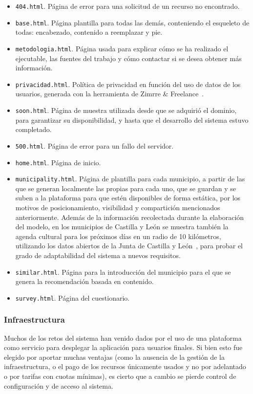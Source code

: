 \begin{itemize}
	\item \texttt{404.html}. Página de error para una solicitud de un recurso no encontrado.
	\item \texttt{base.html}. Página plantilla para todas las demás, conteniendo el esqueleto de todas: encabezado, contenido a reemplazar y pie.
	\item \texttt{metodologia.html}. Página usada para explicar cómo se ha realizado el ejecutable, las fuentes del trabajo y cómo contactar si se desea obtener más información.
	\item \texttt{privacidad.html}. Política de privacidad en función del uso de datos de los usuarios, generada con la herramienta de Zimrre \& Freelance~\cite{privacidad}.
	\item \texttt{soon.html}. Página de muestra utilizada desde que se adquirió el dominio, para garantizar su disponibilidad, y hasta que el desarrollo del sistema estuvo completado.
	\item \texttt{500.html}. Página de error para un fallo del servidor.
	\item \texttt{home.html}. Página de inicio.
	\item \texttt{municipality.html}. Página de plantilla para cada municipio, a partir de las que se generan localmente las propias para cada uno, que se guardan y se suben a la plataforma para que estén disponibles de forma estática, por los motivos de posicionamiento, visibilidad y compartición mencionados anteriormente. Además de la información recolectada durante la elaboración del modelo, en los municipios de Castilla y León se muestra también la agenda cultural para los próximos días en un radio de 10 kilómetros, utilizando los datos abiertos de la Junta de Castilla y León~\cite{agenda}, para probar el grado de adaptabilidad del sistema a nuevos requisitos.
	\item \texttt{similar.html}. Página para la introducción del municipio para el que se genera la recomendación basada en contenido.
	\item \texttt{survey.html}. Página del cuestionario.
\end{itemize}

\subsubsection{Infraestructura}

Muchos de los retos del sistema han venido dados por el uso de una plataforma como servicio para desplegar la aplicación para usuarios finales. Si bien esto fue elegido por aportar muchas ventajas (como la ausencia de la gestión de la infraestructura, o el pago de los recursos únicamente usados y no por adelantado o por tarifas con cuotas mínimas), es cierto que a cambio se pierde control de configuración y de acceso al sistema.

